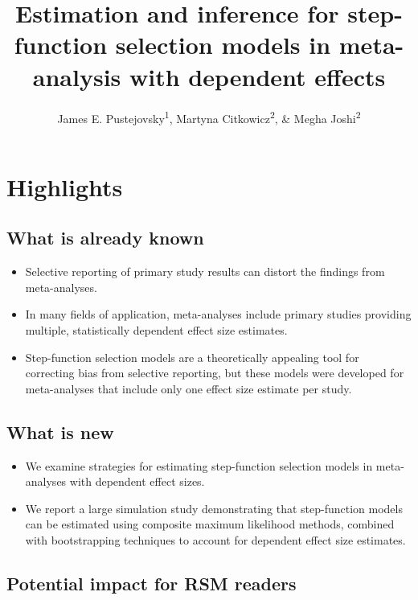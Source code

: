 \documentclass[
  american,
  man, donotrepeattitle,floatsintext]{apa7}
\title{Estimation and inference for step-function selection models in meta-analysis with dependent effects}
\author{James E. Pustejovsky\textsuperscript{1}, Martyna Citkowicz\textsuperscript{2}, \& Megha Joshi\textsuperscript{2}}
\date{}
\affiliation{\vspace{0.5cm}\textsuperscript{1} University of Wisconsin-Madison\\\textsuperscript{2} American Institutes for Research}
\begin{document}
\maketitle

\section*{Highlights}\label{highlights}

\subsection*{What is already known}\label{what-is-already-known}

\begin{itemize}
\item
  Selective reporting of primary study results can distort the findings from meta-analyses.
\item
  In many fields of application, meta-analyses include primary studies providing multiple, statistically dependent effect size estimates.
\item
  Step-function selection models are a theoretically appealing tool for correcting bias from selective reporting, but these models were developed for meta-analyses that include only one effect size estimate per study.
\end{itemize}

\subsection*{What is new}\label{what-is-new}

\begin{itemize}
\item
  We examine strategies for estimating step-function selection models in meta-analyses with dependent effect sizes.
\item
  We report a large simulation study demonstrating that step-function models can be estimated using composite maximum likelihood methods, combined with bootstrapping techniques to account for dependent effect size estimates.
\end{itemize}

\subsection*{Potential impact for RSM readers}\label{potential-impact-for-rsm-readers}
\end{document}

